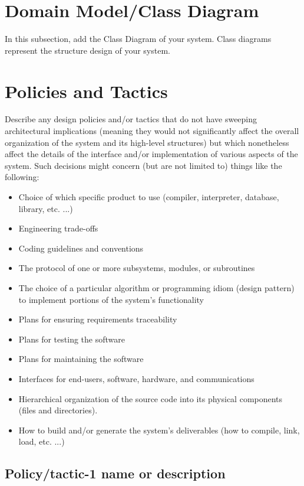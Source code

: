 \documentclass{FastFyp}
\begin{document}
\section{Domain Model/Class Diagram}
In this subsection, add the Class Diagram of your system. Class diagrams represent the structure design of your system.

\section{Policies and Tactics}
Describe any design policies and/or tactics that do not have sweeping architectural implications (meaning they would not significantly affect the overall organization of the system and its high-level structures) but which nonetheless affect the details of the interface and/or implementation of various aspects of the system. Such decisions might concern (but are not limited to) things like the following:
\begin{itemize}
    \item Choice of which specific product to use (compiler, interpreter, database, library, etc. ...) 
 \item Engineering trade-offs 
 \item	Coding guidelines and conventions 
 \item	The protocol of one or more subsystems, modules, or subroutines 
 \item The choice of a particular algorithm or programming idiom (design pattern) to implement portions of the system's functionality 
 \item	Plans for ensuring requirements traceability 
 \item	Plans for testing the software 
 \item	Plans for maintaining the software 
 \item	Interfaces for end-users, software, hardware, and communications 
 \item	Hierarchical organization of the source code into its physical components (files and directories). 
 \item	How to build and/or generate the system's deliverables (how to compile, link, load, etc. ...) 
\end{itemize}
\subsection{Policy/tactic-1 name or description}
\end{document}
